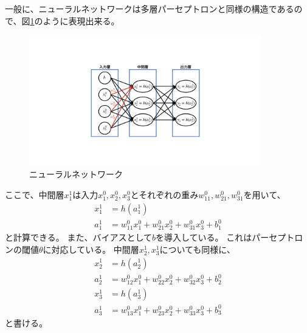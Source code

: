 一般に、ニューラルネットワークは多層パーセプトロンと同様の構造であるので、図\ref{6NeuralNetwork}のように表現出来る。

\begin{figure}[htbp]
 \centering
 \includegraphics[trim = 250 200 250 200, width=0.9\textwidth, clip]{Figure/2DeepLearning/6NeuralNetwork.png}
 \caption{ニューラルネットワーク}
 \label{6NeuralNetwork}
\end{figure}

ここで、中間層$x^1_1$は入力$x^0_1,x^0_2,x^0_3$とそれぞれの重み$w^0_{11},w^0_{21},w^0_{31}$を用いて、
\begin{equation}
 \begin{split}
  x^1_1 &= h(a^1_1)\\
  a^1_1 &= w^0_{11}x^0_1 + w^0_{21}x^0_2 + w^0_{31}x^0_3 + b^0_1
 \end{split}
\end{equation}
と計算できる。
また、バイアスとして$b$を導入している。
これはパーセプトロンの閾値$\theta$に対応している。
中間層$x^1_2,x^1_3$についても同様に、
\begin{equation}
 \begin{split}
  x^1_2 &= h(a^1_2)\\
  a^1_2 &= w^0_{12}x^0_1 + w^0_{22}x^0_2 + w^0_{32}x^0_3 + b^0_2\\
  x^1_3 &= h(a^1_3)\\
  a^1_3 &= w^0_{13}x^0_1 + w^0_{23}x^0_2 + w^0_{33}x^0_3 + b^0_3
 \end{split}
\end{equation}
と書ける。

